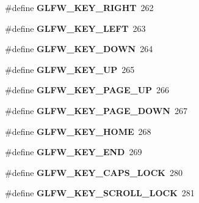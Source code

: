 \begin{DoxyCompactItemize}
\item 
\hypertarget{group__keys_ga06ba07662e8c291a4a84535379ffc7ac}{\#define {\bfseries \-G\-L\-F\-W\-\_\-\-K\-E\-Y\-\_\-\-R\-I\-G\-H\-T}~262}\label{group__keys_ga06ba07662e8c291a4a84535379ffc7ac}

\item 
\hypertarget{group__keys_gae12a010d33c309a67ab9460c51eb2462}{\#define {\bfseries \-G\-L\-F\-W\-\_\-\-K\-E\-Y\-\_\-\-L\-E\-F\-T}~263}\label{group__keys_gae12a010d33c309a67ab9460c51eb2462}

\item 
\hypertarget{group__keys_gae2e3958c71595607416aa7bf082be2f9}{\#define {\bfseries \-G\-L\-F\-W\-\_\-\-K\-E\-Y\-\_\-\-D\-O\-W\-N}~264}\label{group__keys_gae2e3958c71595607416aa7bf082be2f9}

\item 
\hypertarget{group__keys_ga2f3342b194020d3544c67e3506b6f144}{\#define {\bfseries \-G\-L\-F\-W\-\_\-\-K\-E\-Y\-\_\-\-U\-P}~265}\label{group__keys_ga2f3342b194020d3544c67e3506b6f144}

\item 
\hypertarget{group__keys_ga3ab731f9622f0db280178a5f3cc6d586}{\#define {\bfseries \-G\-L\-F\-W\-\_\-\-K\-E\-Y\-\_\-\-P\-A\-G\-E\-\_\-\-U\-P}~266}\label{group__keys_ga3ab731f9622f0db280178a5f3cc6d586}

\item 
\hypertarget{group__keys_gaee0a8fa442001cc2147812f84b59041c}{\#define {\bfseries \-G\-L\-F\-W\-\_\-\-K\-E\-Y\-\_\-\-P\-A\-G\-E\-\_\-\-D\-O\-W\-N}~267}\label{group__keys_gaee0a8fa442001cc2147812f84b59041c}

\item 
\hypertarget{group__keys_ga41452c7287195d481e43207318c126a7}{\#define {\bfseries \-G\-L\-F\-W\-\_\-\-K\-E\-Y\-\_\-\-H\-O\-M\-E}~268}\label{group__keys_ga41452c7287195d481e43207318c126a7}

\item 
\hypertarget{group__keys_ga86587ea1df19a65978d3e3b8439bedd9}{\#define {\bfseries \-G\-L\-F\-W\-\_\-\-K\-E\-Y\-\_\-\-E\-N\-D}~269}\label{group__keys_ga86587ea1df19a65978d3e3b8439bedd9}

\item 
\hypertarget{group__keys_ga92c1d2c9d63485f3d70f94f688d48672}{\#define {\bfseries \-G\-L\-F\-W\-\_\-\-K\-E\-Y\-\_\-\-C\-A\-P\-S\-\_\-\-L\-O\-C\-K}~280}\label{group__keys_ga92c1d2c9d63485f3d70f94f688d48672}

\item 
\hypertarget{group__keys_gaf622b63b9537f7084c2ab649b8365630}{\#define {\bfseries \-G\-L\-F\-W\-\_\-\-K\-E\-Y\-\_\-\-S\-C\-R\-O\-L\-L\-\_\-\-L\-O\-C\-K}~281}\label{group__keys_gaf622b63b9537f7084c2ab649b8365630}


\end{DoxyCompactItemize}
